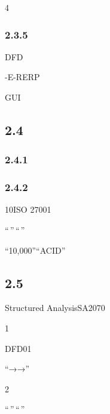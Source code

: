 4

\hypertarget{section-27}{%
\subsubsection{2.3.5}\label{section-27}}



DFD


-E-RERP


GUI

\hypertarget{section-28}{%
\subsection{2.4}\label{section-28}}

\hypertarget{section-29}{%
\subsubsection{2.4.1}\label{section-29}}




\hypertarget{section-30}{%
\subsubsection{2.4.2}\label{section-30}}



10ISO 27001


``\,''\,``\,''

``10,000''``ACID''

\hypertarget{section-31}{%
\subsection{2.5}\label{section-31}}

Structured AnalysisSA2070


1

DFD01

``→→''

2

``\,''\,``\,''

